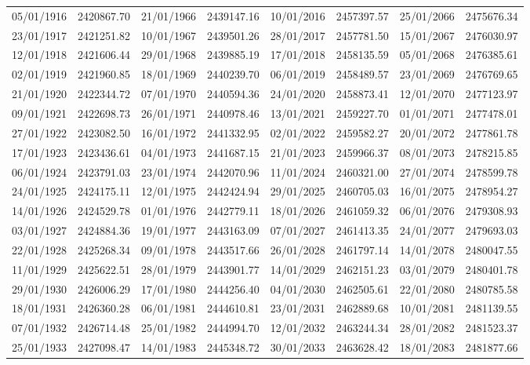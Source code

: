 \begin{table}[!h]
{\begin{tabular}{cc|cc|cc|cc}
05/01/1916 &  2420867.70 &  21/01/1966 &  2439147.16 & 10/01/2016 &  2457397.57 &25/01/2066 & 2475676.34\\
23/01/1917 &  2421251.82 &  10/01/1967 &  2439501.26 & 28/01/2017 &  2457781.50 &15/01/2067 & 2476030.97\\
12/01/1918 &  2421606.44 &  29/01/1968 &  2439885.19 & 17/01/2018 &  2458135.59 &05/01/2068 & 2476385.61\\
02/01/1919 &  2421960.85 &  18/01/1969 &  2440239.70 & 06/01/2019 &  2458489.57 &23/01/2069 & 2476769.65\\
21/01/1920 &  2422344.72 &  07/01/1970 &  2440594.36 & 24/01/2020 &  2458873.41 &12/01/2070 & 2477123.97\\
09/01/1921 &  2422698.73 &  26/01/1971 &  2440978.46 & 13/01/2021 &  2459227.70 &01/01/2071 & 2477478.01\\
27/01/1922 &  2423082.50 &  16/01/1972 &  2441332.95 & 02/01/2022 &  2459582.27 &20/01/2072 & 2477861.78\\
17/01/1923 &  2423436.61 &  04/01/1973 &  2441687.15 & 21/01/2023 &  2459966.37 &08/01/2073 & 2478215.85\\
06/01/1924 &  2423791.03 &  23/01/1974 &  2442070.96 & 11/01/2024 &  2460321.00 &27/01/2074 & 2478599.78\\
24/01/1925 &  2424175.11 &  12/01/1975 &  2442424.94 & 29/01/2025 &  2460705.03 &16/01/2075 & 2478954.27\\
14/01/1926 &  2424529.78 &  01/01/1976 &  2442779.11 & 18/01/2026 &  2461059.32 &06/01/2076 & 2479308.93\\
03/01/1927 &  2424884.36 &  19/01/1977 &  2443163.09 & 07/01/2027 &  2461413.35 &24/01/2077 & 2479693.03\\
22/01/1928 &  2425268.34 &  09/01/1978 &  2443517.66 & 26/01/2028 &  2461797.14 &14/01/2078 & 2480047.55\\
11/01/1929 &  2425622.51 &  28/01/1979 &  2443901.77 & 14/01/2029 &  2462151.23 &03/01/2079 & 2480401.78\\
29/01/1930 &  2426006.29 &  17/01/1980 &  2444256.40 & 04/01/2030 &  2462505.61 &22/01/2080 & 2480785.58\\
18/01/1931 &  2426360.28 &  06/01/1981 &  2444610.81 & 23/01/2031 &  2462889.68 &10/01/2081 & 2481139.55\\
07/01/1932 &  2426714.48 &  25/01/1982 &  2444994.70 & 12/01/2032 &  2463244.34 &28/01/2082 & 2481523.37\\
25/01/1933 &  2427098.47 &  14/01/1983 &  2445348.72 & 30/01/2033 &  2463628.42 &18/01/2083 & 2481877.66\\

\end{tabular}}
\end{table}

